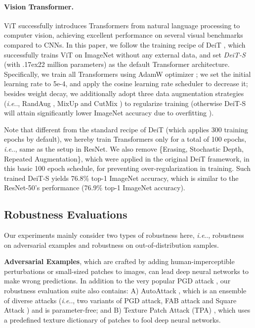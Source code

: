 \documentclass{article}
\makeatletter
\newcommand{\app}{\raise.17ex\hbox{}}
\DeclareRobustCommand\onedot{\futurelet\@let@token\@onedot}
\def\@onedot{\ifx\@let@token.\else.\null\fi\xspace}
\def\ie{\emph{i.e}\onedot} \def\Ie{\emph{I.e}\onedot}
\makeatother
\begin{document}
\paragraph{Vision Transformer.} 
ViT \cite{dosovitskiy2020image} successfully introduces Transformers from natural language processing to computer vision, achieving excellent performance on several visual benchmarks compared to CNNs. In this paper, we follow the training recipe of DeiT \cite{touvron2020training}, which successfully trains ViT on ImageNet without any external data, and set \emph{DeiT-S} (with \app22 million parameters) as the default Transformer architecture. Specifically, we train all Transformers using AdamW optimizer \cite{loshchilov2017decoupled}; we set the initial learning rate to 5e-4, and apply the cosine learning rate scheduler to decrease it; besides weight decay, we additionally adopt three data augmentation strategies (\ie, RandAug \cite{Cubuk2019}, MixUp \cite{Zhang2017a} and CutMix \cite{yun2019CutMix}) to regularize training (otherwise DeiT-S will attain significantly lower ImageNet accuracy due to overfitting \cite{chen2021vision}).

Note that different from the standard recipe of DeiT (which applies 300 training epochs by default), we hereby train Transformers only for a total of 100 epochs, \ie, same as the setup in ResNet. We also remove \{Erasing, Stochastic Depth, Repeated Augmentation\}, which were applied in the original DeiT framework, in this basic 100 epoch schedule, for preventing over-regularization in training. Such trained DeiT-S yields 76.8\% top-1 ImageNet accuracy, which is similar to the ResNet-50's performance (76.9\% top-1 ImageNet accuracy).

\subsection{Robustness Evaluations}
Our experiments mainly consider two types of robustness here, \ie,  robustness on adversarial examples and robustness on out-of-distribution samples. 

\textbf{Adversarial Examples}, which are crafted by adding human-imperceptible perturbations or small-sized patches to images, can lead deep neural networks to make wrong predictions. In addition to the very popular PGD attack \cite{Madry2018}, our robustness evaluation suite also contains: A) AutoAttack \cite{croce2020reliable}, which is an ensemble of diverse attacks (\ie, two variants of PGD attack, FAB attack \cite{croce2020minimally} and Square Attack \cite{andriushchenko2020square}) and is parameter-free; and B) Texture Patch Attack (TPA) \cite{yang2020patchattack}, which uses a predefined texture dictionary of patches to fool deep neural networks. 
\end{document}
